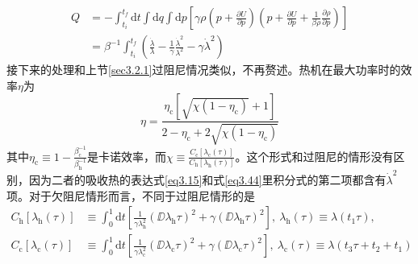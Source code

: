 \begin{equation}
    \begin{split}
        Q &=-\int_{t_i}^{t_f} \mathrm{d} t \int \mathrm{d} q \int \mathrm{d} p\left[\gamma \rho\left(p+\frac{\partial U}{\partial p}\right)\left(p+\frac{\partial U}{\partial p}+\frac{1}{\beta \rho} \frac{\partial \rho}{\partial p}\right)\right]\\
        &=\beta^{-1} \int_{t_i}^{t_f} \left(\frac{\dot{\lambda}}{\lambda}-\frac{1}{\gamma} \frac{\dot{\lambda}^{2}}{\lambda^{2}}-\gamma \dot{\lambda}^{2}\right)
    \end{split}
    \label{eq3.44}
\end{equation}
接下来的处理和上节\ref{sec3.2.1}过阻尼情况类似，不再赘述。热机在最大功率时的效率$\eta$为
\begin{equation}
    \eta=\frac{\eta_{\mathrm{c}}\left[\sqrt{\chi(1-\eta_{\mathrm{c}})}+1\right]}{2-\eta_{\mathrm{c}}+2 \sqrt{\chi\left(1-\eta_{\mathrm{c}}\right)}}
    \label{3.45}
\end{equation}
其中$\eta_{\mathrm{c}}\equiv 1-\frac{\beta_{\mathrm{c}}^{-1}}{\beta_{\mathrm{h}}^{-1}}$是卡诺效率，而$\chi\equiv\frac{C_{\mathrm{c}} [\lambda_{\mathrm{c}}(\tau)]}{C_{\mathrm{h}} [\lambda_{\mathrm{h}}(\tau)]}$。这个形式和过阻尼的情形没有区别，因为二者的吸收热的表达式\eqref{eq3.15}和式\eqref{eq3.44}里积分式的第二项都含有$\dot{\lambda}^2$项。对于欠阻尼情形而言，不同于过阻尼情形的是
\begin{equation}
    \begin{split}
        C_{\mathrm{h}} [\lambda_{\mathrm{h}}(\tau)]&\equiv \int_{{0}}^{{1}} \mathrm{d} t\left[\frac{1}{\gamma{\lambda_{\mathrm{h}}^{2}}} \left(\DD{{\lambda_{\mathrm{h}}}}{\tau}\right)^{2}+\gamma \left({\DD{\lambda_{\mathrm{h}}}{\tau}}\right)^{2} \right],\ \lambda_{\mathrm{h}}(\tau)\equiv\lambda(t_1 \tau),\\
        C_{\mathrm{c}} [\lambda_{\mathrm{c}}(\tau)]&\equiv \int_{{0}}^{{1}} \mathrm{d} t\left[\frac{1}{\gamma{\lambda_{\mathrm{c}}^{2}}} \left(\DD{{\lambda_{\mathrm{c}}}}{\tau}\right)^{2}+\gamma \left({\DD{\lambda_{\mathrm{c}}}{\tau}}\right)^{2} \right],\ \lambda_{\mathrm{c}}(\tau)\equiv\lambda(t_3 \tau + t_2 +t_1)
    \end{split}
    \label{3.46}
\end{equation}


